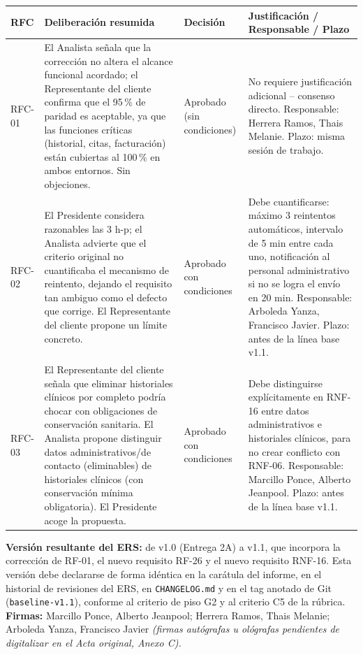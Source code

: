 \documentclass[11pt,a4paper]{article}
\begin{document}
\begin{longtable}{p{1.7cm}p{5.4cm}p{2.1cm}p{4.0cm}}
\toprule
\textbf{RFC} & \textbf{Deliberación resumida} & \textbf{Decisión} & \textbf{Justificación / Responsable / Plazo} \\
\midrule
\endhead
RFC-01 & El Analista señala que la corrección no altera el alcance funcional acordado; el Representante del cliente confirma que el 95\,\% de paridad es aceptable, ya que las funciones críticas (historial, citas, facturación) están cubiertas al 100\,\% en ambos entornos. Sin objeciones. &
Aprobado (sin condiciones) &
No requiere justificación adicional -- consenso directo. Responsable: Herrera Ramos, Thais Melanie. Plazo: misma sesión de trabajo. \\
\addlinespace
RFC-02 & El Presidente considera razonables las 3 h-p; el Analista advierte que el criterio original no cuantificaba el mecanismo de reintento, dejando el requisito tan ambiguo como el defecto que corrige. El Representante del cliente propone un límite concreto. &
Aprobado con condiciones &
Debe cuantificarse: máximo 3 reintentos automáticos, intervalo de 5 min entre cada uno, notificación al personal administrativo si no se logra el envío en 20 min. Responsable: Arboleda Yanza, Francisco Javier. Plazo: antes de la línea base v1.1. \\
\addlinespace
RFC-03 & El Representante del cliente señala que eliminar historiales clínicos por completo podría chocar con obligaciones de conservación sanitaria. El Analista propone distinguir datos administrativos/de contacto (eliminables) de historiales clínicos (con conservación mínima obligatoria). El Presidente acoge la propuesta. &
Aprobado con condiciones &
Debe distinguirse explícitamente en RNF-16 entre datos administrativos e historiales clínicos, para no crear conflicto con RNF-06. Responsable: Marcillo Ponce, Alberto Jeanpool. Plazo: antes de la línea base v1.1. \\
\bottomrule
\end{longtable}

\textbf{Versión resultante del ERS:} de v1.0 (Entrega 2A) a v1.1, que
incorpora la corrección de RF-01, el nuevo requisito RF-26 y el nuevo
requisito RNF-16. Esta versión debe declararse de forma idéntica en la
carátula del informe, en el historial de revisiones del ERS, en
\texttt{CHANGELOG.md} y en el tag anotado de Git (\texttt{baseline-v1.1}),
conforme al criterio de piso G2 y al criterio C5 de la rúbrica. \\
\textbf{Firmas:} Marcillo Ponce, Alberto Jeanpool; Herrera Ramos, Thais
Melanie; Arboleda Yanza, Francisco Javier \emph{(firmas autógrafas u
ológrafas pendientes de digitalizar en el Acta original, Anexo C).}
\end{document}
